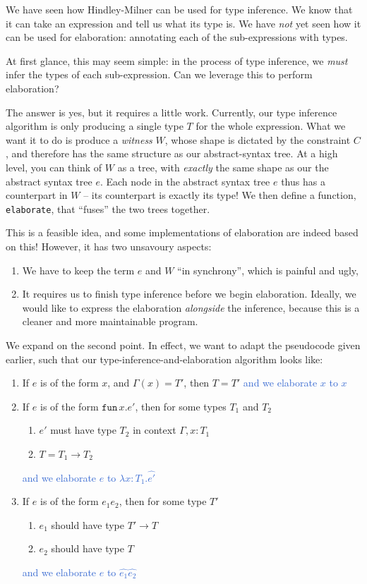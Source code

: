{We have seen how Hindley-Milner can be used for type inference. We know that it can take an expression and tell us what its type is. We have \textit{not} yet seen how it can be used for elaboration: annotating each of the sub-expressions with types. 

At first glance, this may seem simple: in the process of type inference, we \textit{must} infer the types of each sub-expression. Can we leverage this to perform elaboration?

The answer is yes, but it requires a little work. Currently, our type inference algorithm is only producing a single type $T$ for the whole expression. What we want it to do is produce a \textit{witness} $W$, whose shape is dictated by the constraint $C$, and therefore has the same structure as our abstract-syntax tree. At a high level, you can think of $W$ as a tree, with \textit{exactly} the same shape as our the abstract syntax tree $e$. Each node in the abstract syntax tree $e$ thus has a counterpart in $W$ -- its counterpart is exactly its type! We then define a function, \texttt{elaborate}, that ``fuses'' the two trees together.

This is a feasible idea, and some implementations of elaboration are indeed based on this! However, it has two unsavoury aspects:
\begin{enumerate}
    \item We have to keep the term $e$ and $W$ ``in synchrony'', which is painful and ugly,
    \item It requires us to finish type inference before we begin elaboration. Ideally, we would like to express the elaboration \textit{alongside} the inference, because this is a cleaner and more maintainable program.
\end{enumerate}

We expand on the second point. In effect, we want to adapt the pseudocode given earlier, such that our type-inference-and-elaboration algorithm looks like:

\begin{enumerate}
    \item If $e$ is of the form $x$, and $\Gamma(x) = T'$, then $T = T'$ \textcolor{highlight}{and we elaborate $x$ to $x$}
    \item If $e$ is of the form $\texttt{fun} \, x. e'$, then for some types $T_1$ and $T_2$
    \begin{enumerate}
        \item $e'$ must have type $T_2$ in context $\Gamma, x: T_1$ 
        \item $T = T_1 \to T_2$
    \end{enumerate}
    \textcolor{highlight}{and we elaborate $e$ to $\lambda x: T_1 . \hat{e'}$}
    \item If $e$ is of the form $e_1 e_2$, then for some type $T'$
    \begin{enumerate}
        \item $e_1$ should have type $T' \to T$
        \item $e_2$ should have type $T$
    \end{enumerate}
    \textcolor{highlight}{and we elaborate $e$ to $\hat{e_1} \hat{e_2}$}
\end{enumerate}

}
